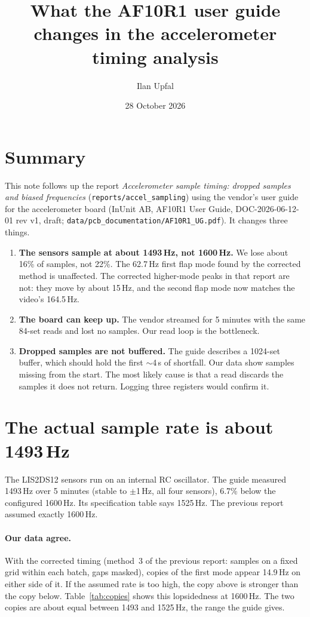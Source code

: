 \documentclass[11pt]{article}
\title{What the AF10R1 user guide changes in the accelerometer timing analysis}
\author{Ilan Upfal}
\date{28 October 2026}
\newcommand{\code}[1]{\texttt{#1}}
\begin{document}
\maketitle

\section*{Summary}

This note follows up the report \emph{Accelerometer sample timing: dropped
samples and biased frequencies} (\code{reports/accel\_sampling}) using the
vendor's user guide for the accelerometer board (InUnit AB, AF10R1 User Guide,
DOC-2026-06-12-01 rev v1, draft; \code{data/pcb\_documentation/AF10R1\_UG.pdf}).
It changes three things.

\begin{enumerate}
  \item \textbf{The sensors sample at about 1493\,Hz, not 1600\,Hz.} We lose
        about 16\% of samples, not 22\%. The 62.7\,Hz first flap mode found
        by the corrected method is unaffected. The corrected higher-mode
        peaks in that report are not: they move by about 15\,Hz, and the
        second flap mode now matches the video's 164.5\,Hz.
  \item \textbf{The board can keep up.} The vendor streamed for 5 minutes with
        the same 84-set reads and lost no samples. Our read loop is the
        bottleneck.
  \item \textbf{Dropped samples are not buffered.} The guide describes a
        1024-set buffer, which should hold the first $\sim$4\,s of
        shortfall. Our data show samples missing from the start. The most
        likely cause is that a read discards the samples it does not return.
        Logging three registers would confirm it.
\end{enumerate}

\section{The actual sample rate is about 1493\,Hz}

The LIS2DS12 sensors run on an internal RC oscillator. The guide measured
1493\,Hz over 5 minutes (stable to $\pm$1\,Hz, all four sensors), 6.7\%
below the configured 1600\,Hz. Its specification table says 1525\,Hz. The
previous report assumed exactly 1600\,Hz.

\paragraph{Our data agree.} With the corrected timing (method~3 of the
previous report: samples on a fixed grid within each batch, gaps masked),
copies of the first mode appear 14.9\,Hz on either side of it. If the
assumed rate is too high, the copy above is stronger than the copy below.
Table~\ref{tab:copies} shows this lopsidedness at 1600\,Hz. The two copies are
about equal between 1493 and 1525\,Hz, the range the guide gives.
\end{document}
